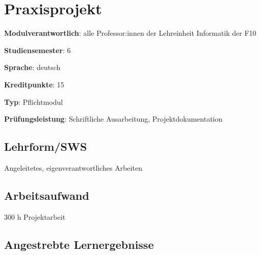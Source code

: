 \hypertarget{praxisprojektpathlabelmi-2017modulbeschreibungen-bachelorba_praxisprojekt}{%
\chapter{Praxisprojekt\label{/mi-2017/modulbeschreibungen-bachelor/BA_Praxisprojekt}}\label{praxisprojektpathlabelmi-2017modulbeschreibungen-bachelorba_praxisprojekt}}

\begin{modulHead}
\textbf{Modulverantwortlich}: alle Professor:innen
der Lehreinheit Informatik der
F10
\end{modulHead}
\begin{modulHead}
\textbf{Studiensemester}:
6
\end{modulHead}
\begin{modulHead}
\textbf{Sprache}:
deutsch
\end{modulHead}
\begin{modulHead}
\textbf{Kreditpunkte}:
15
\end{modulHead}
\begin{modulHead}
\textbf{Typ}:
Pflichtmodul
\end{modulHead}
\begin{modulHead}
\textbf{Prüfungsleistung}:
Schriftliche Ausarbeitung, Projektdokumentation
\end{modulHead}


\hypertarget{lehrformswspathlabelmi-2017modulbeschreibungen-bachelorba_praxisprojekt}{%
\section*{Lehrform/SWS\label{/mi-2017/modulbeschreibungen-bachelor/BA_Praxisprojekt}}\label{lehrformswspathlabelmi-2017modulbeschreibungen-bachelorba_praxisprojekt}}

Angeleitetes, eigenverantwortliches Arbeiten

\hypertarget{arbeitsaufwandpathlabelmi-2017modulbeschreibungen-bachelorba_praxisprojekt}{%
\section*{Arbeitsaufwand\label{/mi-2017/modulbeschreibungen-bachelor/BA_Praxisprojekt}}\label{arbeitsaufwandpathlabelmi-2017modulbeschreibungen-bachelorba_praxisprojekt}}

300 h Projektarbeit

\hypertarget{angestrebte-lernergebnissepathlabelmi-2017modulbeschreibungen-bachelorba_praxisprojekt}{%
\section*{Angestrebte
Lernergebnisse\label{/mi-2017/modulbeschreibungen-bachelor/BA_Praxisprojekt}}\label{angestrebte-lernergebnissepathlabelmi-2017modulbeschreibungen-bachelorba_praxisprojekt}}

